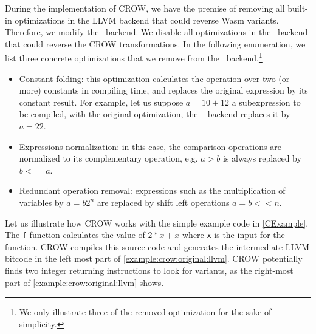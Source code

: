 
During the implementation of CROW, we have the premise of removing all built-in optimizations in the LLVM backend that could reverse Wasm variants.
Therefore, we modify the \wasm\ backend.
We disable all optimizations in the \wasm\ backend that could reverse the CROW transformations.
In the following enumeration, we list three concrete optimizations that we remove from the \wasm~backend.\footnote{
We only illustrate three of the removed optimization for the sake of simplicity.}

\begin{itemize}
    \item Constant folding: this optimization calculates the operation over two (or more) constants in compiling time, and replaces the original expression by its constant result. For example, let us suppose \texttt{$a = 10 + 12$} a subexpression to be compiled, with the original optimization, the \wasm~ backend replaces it by \texttt{$a = 22$}.
    
    \item Expressions normalization: in this case, the comparison operations are normalized to its complementary operation, e.g. \texttt{$a > b$} is always replaced by \texttt{$b <= a$}.
    
    \item Redundant operation removal: expressions such as the multiplication of variables by \texttt{$a = b2^n$} are replaced by shift left operations \texttt{$a = b << n$}.  
\end{itemize}


\label{section:crow:example}

Let us illustrate how CROW works with the simple example code in \autoref{CExample}. The \texttt{f} function calculates the value of $2 * x + x$ where \texttt{x} is the input for the function.  CROW compiles this source code and generates the intermediate LLVM bitcode in the left most part of \autoref{example:crow:original:llvm}. CROW potentially finds two integer returning instructions to look for variants, as the right-most part of \autoref{example:crow:original:llvm} shows.

